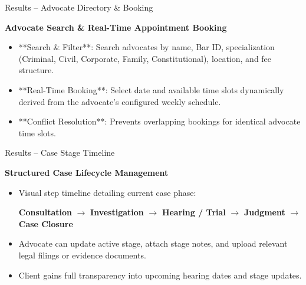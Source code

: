 \documentclass[10pt,aspectratio=169]{beamer}
\begin{document}
\begin{frame}{Results -- Advocate Directory \& Booking}
  \begin{block}{\textbf{Advocate Search \& Real-Time Appointment Booking}}
    \begin{itemize}
      \item **Search & Filter**: Search advocates by name, Bar ID, specialization (Criminal, Civil, Corporate, Family, Constitutional), location, and fee structure.
      \item **Real-Time Booking**: Select date and available time slots dynamically derived from the advocate's configured weekly schedule.
      \item **Conflict Resolution**: Prevents overlapping bookings for identical advocate time slots.
    \end{itemize}
  \end{block}
\end{frame}

\begin{frame}{Results -- Case Stage Timeline}
  \begin{block}{\textbf{Structured Case Lifecycle Management}}
    \begin{itemize}
      \item Visual step timeline detailing current case phase:
        \begin{center}
          \small \textbf{Consultation} $\rightarrow$ \textbf{Investigation} $\rightarrow$ \textbf{Hearing / Trial} $\rightarrow$ \textbf{Judgment} $\rightarrow$ \textbf{Case Closure}
        \end{center}
      \item Advocate can update active stage, attach stage notes, and upload relevant legal filings or evidence documents.
      \item Client gains full transparency into upcoming hearing dates and stage updates.
    \end{itemize}
  \end{block}
\end{frame}
\end{document}
